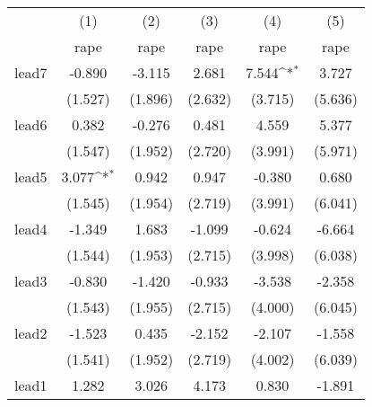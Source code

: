 {
\def\sym#1{\ifmmode^{#1}\else\(^{#1}\)\fi}
\begin{tabular}{l*{5}{c}}
\hline\hline
            &\multicolumn{1}{c}{(1)}&\multicolumn{1}{c}{(2)}&\multicolumn{1}{c}{(3)}&\multicolumn{1}{c}{(4)}&\multicolumn{1}{c}{(5)}\\
            &\multicolumn{1}{c}{rape}&\multicolumn{1}{c}{rape}&\multicolumn{1}{c}{rape}&\multicolumn{1}{c}{rape}&\multicolumn{1}{c}{rape}\\
\hline
lead7       &      -0.890         &      -3.115         &       2.681         &       7.544\sym{*}  &       3.727         \\
            &     (1.527)         &     (1.896)         &     (2.632)         &     (3.715)         &     (5.636)         \\
[1em]
lead6       &       0.382         &      -0.276         &       0.481         &       4.559         &       5.377         \\
            &     (1.547)         &     (1.952)         &     (2.720)         &     (3.991)         &     (5.971)         \\
[1em]
lead5       &       3.077\sym{*}  &       0.942         &       0.947         &      -0.380         &       0.680         \\
            &     (1.545)         &     (1.954)         &     (2.719)         &     (3.991)         &     (6.041)         \\
[1em]
lead4       &      -1.349         &       1.683         &      -1.099         &      -0.624         &      -6.664         \\
            &     (1.544)         &     (1.953)         &     (2.715)         &     (3.998)         &     (6.038)         \\
[1em]
lead3       &      -0.830         &      -1.420         &      -0.933         &      -3.538         &      -2.358         \\
            &     (1.543)         &     (1.955)         &     (2.715)         &     (4.000)         &     (6.045)         \\
[1em]
lead2       &      -1.523         &       0.435         &      -2.152         &      -2.107         &      -1.558         \\
            &     (1.541)         &     (1.952)         &     (2.719)         &     (4.002)         &     (6.039)         \\
[1em]
lead1       &       1.282         &       3.026         &       4.173         &       0.830         &      -1.891         \\

\end{tabular}}
